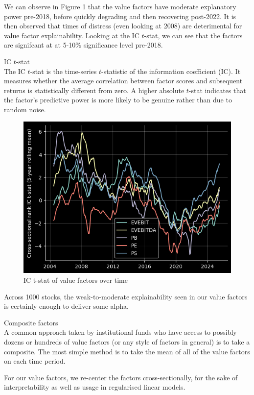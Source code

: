 \documentclass[12pt]{article}
\begin{document}
We can observe in Figure 1 that the value factors have moderate explanatory power pre-2018, before 
quickly degrading and then recovering post-2022. It is then observed that times of distress (even looking
at 2008) are deterimental for value factor explainability. Looking at the IC $t$-stat, we can see that 
the factors are signifcant at at 5-10\% significance level pre-2018.
\begin{theory}{IC $t$-stat} \\
    The IC $t$-stat is the time-series $t$-statistic of the
    information coefficient (IC). It measures whether the
    average correlation between factor scores and subsequent
    returns is statistically different from zero. A higher
    absolute $t$-stat indicates that the factor’s predictive
    power is more likely to be genuine rather than due to
    random noise.
\end{theory}
\begin{figure}[H]
    \centering
    \includegraphics[width=13cm]{./static/value_factor_t_stat.png}
    \caption{IC t-stat of value factors over time}
    \label{fig:value_factor_t_stat}
\end{figure}
Across 1000 stocks, the weak-to-moderate explainability seen in our value factors is certainly enough
to deliver some alpha.
\begin{aside}{Composite factors} \\
    A common approach taken by institutional funds who have access to possibly dozens or hundreds
    of value factors (or any style of factors in general) is to take a composite. The most simple 
    method is to take the mean of all of the value factors on each time period.
\end{aside}
For our value factors, we re-center the factors cross-sectionally, for the sake of interpretability as 
well as usage in regularised linear models.
\end{document}
